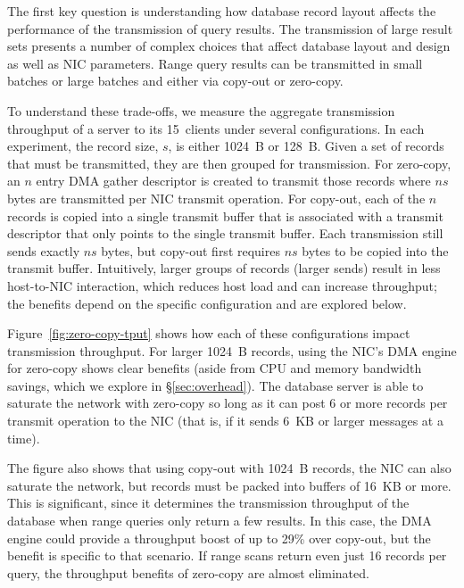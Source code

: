 The first key question is understanding how database record layout affects the
performance of the transmission of query results.  The transmission of large
result sets presents a number of complex choices that affect
database layout and design as well as NIC parameters.  Range query
results can be transmitted in small batches or large batches and either via
copy-out or zero-copy.

To understand these trade-offs, we measure the aggregate transmission
throughput of a server to its 15~clients under several
configurations.  In each experiment, the record size, $s$, is either 1024~B or
128~B. Given a set of records that must be transmitted, they are then grouped
for transmission. For zero-copy, an $n$ entry DMA gather descriptor is created
to transmit those records where $ns$ bytes are transmitted per NIC transmit
operation. For copy-out, each of the $n$ records is copied into a single
transmit buffer that is associated with a transmit descriptor that only points
to the single transmit buffer. Each transmission still sends exactly $ns$
bytes, but copy-out first requires $ns$ bytes to be copied into the transmit buffer.
Intuitively, larger groups of records (larger sends) result in less host-to-NIC
interaction, which reduces host load and can increase throughput; the benefits
depend on the specific configuration and are explored below.


Figure~\ref{fig:zero-copy-tput} shows how each of these configurations impact
transmission throughput. For larger 1024~B records, using the NIC's DMA engine
for zero-copy shows clear benefits (aside from CPU and memory bandwidth
savings, which we explore in \S\ref{sec:overhead}). The database server is able
to saturate the network with zero-copy so long as it can post 6 or more
records per transmit operation to the NIC (that is, if it sends 6~KB or larger
messages at a time).

The figure also shows that using copy-out with 1024~B records, the NIC can also
saturate the network, but records must be packed into buffers of 16~KB or more.
This is significant, since it determines the transmission
throughput of the database when range queries only return a few
results. In this case, the DMA engine could provide a throughput boost
of up to 29\% over copy-out, but the benefit is specific to
that scenario. If range scans return even just 16 records per query, the
throughput benefits of zero-copy are almost eliminated.

